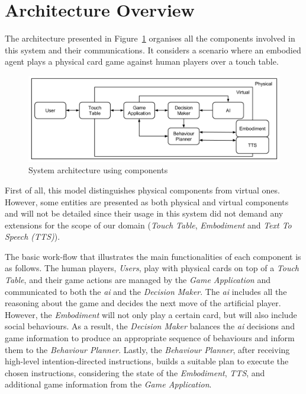 \section{Architecture Overview}
\label{section:architecture-overview}

The architecture presented in Figure~\ref{fig:architecture} organises all the components involved in this system and their communications.
It considers a scenario where an embodied agent plays a physical card game against human players over a touch table.

\begin{figure}[ht]
  \centering
    \includegraphics[width=\textwidth]{./img/6/architecture}
  \caption{System architecture using components}
\label{fig:architecture}
\end{figure}

First of all, this model distinguishes physical components from virtual ones.
However, some entities are presented as both physical and virtual components and will not be detailed since their usage in this system did not demand any extensions for the scope of our domain (\emph{Touch Table}, \emph{Embodiment} and \emph{Text To Speech (TTS)}).

The basic work-flow that illustrates the main functionalities of each component is as follows.
The human players, \emph{Users}, play with physical cards on top of a \emph{Touch Table}, and their game actions are managed by the \emph{Game Application} and communicated to both the \emph{\ac{ai}} and the \emph{Decision Maker}.
The \emph{\ac{ai}} includes all the reasoning about the game and decides the next move of the artificial player.
However, the \emph{Embodiment} will not only play a certain card, but will also include social behaviours.
As a result, the \emph{Decision Maker} balances the \emph{\ac{ai}} decisions and game information to produce an appropriate sequence of behaviours and inform them to the \emph{Behaviour Planner}.
Lastly, the \emph{Behaviour Planner}, after receiving high-level intention-directed instructions, builds a suitable plan to execute the chosen instructions, considering the state of the \emph{Embodiment}, \emph{TTS}, and additional game information from the \emph{Game Application}.

